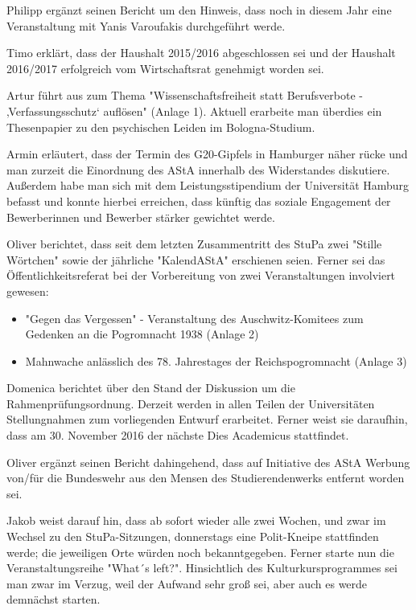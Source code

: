 \documentclass[ngerman,headheight=70pt]{scrartcl}
\begin{document}
    Philipp ergänzt seinen Bericht um den Hinweis, dass noch in diesem Jahr eine
    Veranstaltung mit Yanis Varoufakis durchgeführt werde.

    Timo erklärt, dass der Haushalt 2015/2016 abgeschlossen sei und der Haushalt
    2016/2017 erfolgreich vom Wirtschaftsrat genehmigt worden sei.

    Artur führt aus zum Thema "Wissenschaftsfreiheit statt Berufsverbote -
    ‚Verfassungsschutz‘ auflösen" (Anlage 1).  Aktuell erarbeite man überdies ein
    Thesenpapier zu den psychischen Leiden im Bologna-Studium.

    Armin erläutert, dass der Termin des G20-Gipfels in Hamburger näher rücke
    und man zurzeit die Einordnung des AStA innerhalb des Widerstandes diskutiere.
    Außerdem habe man sich mit dem Leistungsstipendium der Universität Hamburg
    befasst und konnte hierbei erreichen, dass künftig das soziale Engagement
    der Bewerberinnen und Bewerber stärker gewichtet werde.

    Oliver berichtet, dass seit dem letzten Zusammentritt des StuPa zwei
    "Stille Wörtchen" sowie der jährliche "KalendAStA" erschienen seien. Ferner
    sei das Öffentlichkeitsreferat bei der Vorbereitung von zwei Veranstaltungen
    involviert gewesen:

    \begin{itemize}
        \item "Gegen das Vergessen" - Veranstaltung des Auschwitz-Komitees zum
        Gedenken an die Pogromnacht 1938 (Anlage 2)
        \item Mahnwache anlässlich des 78. Jahrestages der Reichspogromnacht (Anlage 3)
    \end{itemize}

    Domenica berichtet über den Stand der Diskussion um die Rahmenprüfungsordnung.
    Derzeit werden in allen Teilen der Universitäten Stellungnahmen zum
    vorliegenden Entwurf erarbeitet. Ferner weist sie daraufhin, dass am
    30. November 2016 der nächste Dies Academicus stattfindet.

    Oliver ergänzt seinen Bericht dahingehend, dass auf Initiative des AStA
    Werbung von/für die Bundeswehr aus den Mensen des Studierendenwerks
    entfernt worden sei.

    Jakob weist darauf hin, dass ab sofort wieder alle zwei Wochen, und zwar im
    Wechsel zu den StuPa-Sitzungen, donnerstags eine Polit-Kneipe stattfinden
    werde; die jeweiligen Orte würden noch bekanntgegeben. Ferner starte nun die
    Veranstaltungsreihe "What´s left?". Hinsichtlich des Kulturkursprogrammes
    sei man zwar im Verzug, weil der Aufwand sehr groß sei, aber auch es werde
    demnächst starten.
\end{document}
